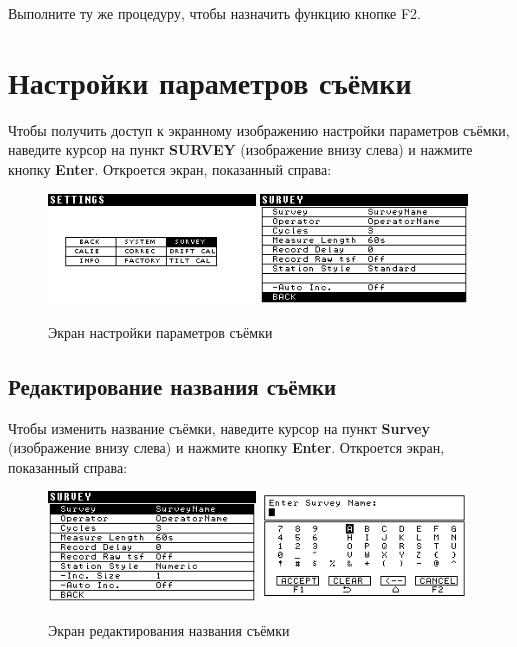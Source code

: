 Выполните ту же процедуру, чтобы назначить функцию кнопке F2.

\section{Настройки параметров съёмки}

Чтобы получить доступ к экранному изображению настройки параметров съёмки,
наведите курсор на пункт \textbf{SURVEY} (изображение внизу слева) и нажмите кнопку
\textbf{Enter}. Откроется экран, показанный справа:

\begin{figure}[H]
  \centering
  \includegraphics[width=0.49\textwidth]{figures/the_survey_setting_screen_1}
  \includegraphics[width=0.49\textwidth]{figures/the_survey_setting_screen_2}
  \caption{Экран настройки параметров съёмки}
  \label{fig:the_survey_setting_screen}
\end{figure}

\subsection{Редактирование названия съёмки}

Чтобы изменить название съёмки, наведите курсор на пункт \textbf{Survey}
(изображение внизу слева) и нажмите кнопку \textbf{Enter}. Откроется экран,
показанный справа:

\newpage
\begin{figure}[H]
  \centering
  \includegraphics[width=0.49\textwidth]{figures/the_survey_name_editing_screen_1}
  \includegraphics[width=0.49\textwidth]{figures/the_survey_name_editing_screen_2}
  \caption{Экран редактирования названия съёмки}
  \label{fig:the_survey_name_editing_screen}
\end{figure}

